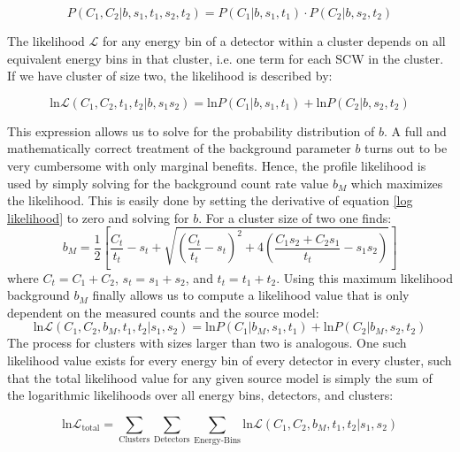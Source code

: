 \documentclass{report}
\begin{document}
\begin{equation}
    P(C_1, C_2 \vert b, s_1, t_1, s_2, t_2) = P(C_1 \vert b, s_1, t_1) \cdot P(C_2 \vert b, s_2, t_2)
\end{equation}

The likelihood $\mathcal{L}$ for any energy bin of a detector within a cluster depends on all equivalent energy bins in that cluster, i.e. one term for each SCW in the cluster. If we have cluster of size two, the likelihood is described by:

\begin{equation}\label{log likelihood}
    \text{ln}\mathcal{L}(C_1, C_2, t_1, t_2\vert b, s_1 s_2) = \text{ln}P(C_1 \vert b, s_1, t_1) + \text{ln}P(C_2 \vert b, s_2, t_2)
\end{equation}

This expression allows us to solve for the probability distribution of $b$. A full and mathematically correct treatment of the background parameter $b$ turns out to be very cumbersome with only marginal benefits. Hence, the profile likelihood is used by simply solving for the background count rate value $b_M$ which maximizes the likelihood. This is easily done by setting the derivative of equation \ref{log likelihood} to zero and solving for $b$. For a cluster size of two one finds:
\begin{equation} \label{eq: max lik back}
    b_M = \frac{1}{2} \left[ \frac{C_t}{t_t} - s_t + \sqrt{\left( \frac{C_t}{t_t} - s_t\right)^2 + 4 \left( \frac{C_1s_2+C_2s_1}{t_t}-s_1s_2\right)}\right]
\end{equation}
where $C_t=C_1+C_2$, $s_t=s_1+s_2$, and $t_t=t_1+t_2$. Using this maximum likelihood background $b_M$ finally allows us to compute a likelihood value that is only dependent on the measured counts and the source model:
\begin{equation} \label{log_likelihood final}
    \text{ln}\mathcal{L}(C_1, C_2, b_M, t_1, t_2 \vert s_1, s_2) = \text{ln}P(C_1 \vert b_M, s_1, t_1) + \text{ln}P(C_2 \vert b_M, s_2, t_2)
\end{equation}
The process for clusters with sizes larger than two is analogous. One such likelihood value exists for every energy bin of every detector in every cluster, such that the total likelihood value for any given source model is simply the sum of the logarithmic likelihoods over all energy bins, detectors, and clusters:

\begin{equation} \label{total log likelihood}
  \text{ln}\mathcal{L}_{\text{total}} = \sum_{\text{Clusters}}\sum_{\text{Detectors}}\sum_{\text{Energy-Bins}} \text{ln}\mathcal{L}(C_1, C_2, b_M, t_1, t_2 \vert s_1, s_2)
\end{equation}
\end{document}
